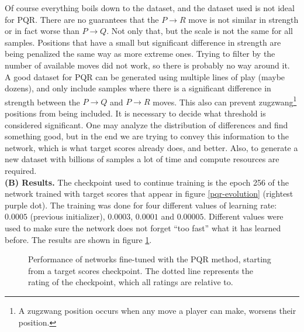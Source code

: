 Of course everything boils down to the dataset, and the dataset used is not ideal for PQR. There are no guarantees that the $P \rightarrow R$ move is not similar in strength or in fact worse than $P \rightarrow Q$. Not only that, but the scale is not the same for all samples. Positions that have a small but significant difference in strength are being penalized the same way as more extreme ones. Trying to filter by the number of available moves did not work, so there is probably no way around it. \\

A good dataset for PQR can be generated using multiple lines of play (maybe dozens), and only include samples where there is a significant difference in strength between the $P \rightarrow Q$ and $P \rightarrow R$ moves. This also can prevent zugzwang\footnote{A zugzwang position occurs when any move a player can make, worsens their position.} positions from being included. It is necessary to decide what threshold is considered significant. One may analyze the distribution of differences and find something good, but in the end we are trying to convey this information to the network, which is what target scores already does, and better. Also, to generate a new dataset with billions of samples a lot of time and compute resources are required. \\

\textbf{(B) Results.} The checkpoint used to continue training is the epoch 256 of the network trained with target scores that appear in figure \ref{pqr-evolution} (rightest purple dot). The training was done for four different values of learning rate: $0.0005$ (previous initializer), $0.0003$, $0.0001$ and $0.00005$. Different values were used to make sure the network does not forget \enquote{too fast} what it has learned before. The results are shown in figure \ref{pqr-ckp}.

\begin{figure}[H]
\centering
{}
\caption{Performance of networks fine-tuned with the PQR method, starting from a target scores checkpoint. The dotted line represents the rating of the checkpoint, which all ratings are relative to.}
\label{pqr-ckp}
\end{figure}

